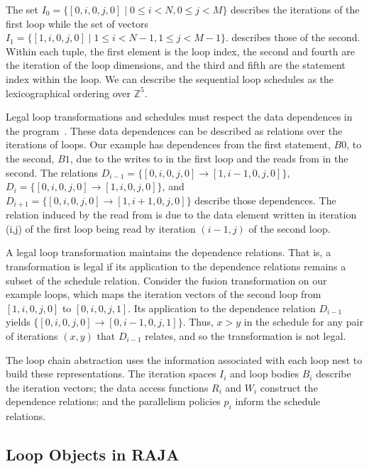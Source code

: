 The set $I_{0}=\{[0,i,0,j,0] \; | \; 0 \leq i < N, 0 \leq j < M\}$ describes
the iterations of the first loop while the set of vectors
$I_{1} = \{[1,i,0,j,0] \; | \; 1 \leq i < N-1, 1 \leq j < M-1\}$. describes
those of the second.
Within each tuple, the first element is the loop index, the second and fourth are the iteration of the loop dimensions, and the third and fifth are the statement index within the loop. 
We can describe the sequential loop schedules as the lexicographical ordering over
$\mathbb{Z}^{5}$.

Legal loop transformations and schedules must respect the data dependences
in the program~\cite{frameworkKP95pub}.
These data dependences can be described as relations over the iterations 
of loops.
Our example has dependences from the first statement, $B0$, to the second,
$B1$, due to the writes to  in the first loop and the reads from
 in the second. 
The relations $D_{i-1} = \{[0,i,0,j,0] \to [1,i-1,0,j,0]\}$,
$D_{i} = \{[0,i,0,j,0] \to [1,i,0,j,0]\}$, and
$D_{i+1} = \{[0,i,0,j,0] \to [1,i+1,0,j,0]\}$ describe those dependences. 
The relation induced by the read from  
is due to the data element written in iteration (i,j) of the
first loop being read by iteration $(i-1,j)$ of the second loop. %

A legal loop transformation maintains the dependence relations. 
That is, a transformation is legal if its application to the dependence
relations remains a subset of the schedule relation.
Consider the fusion transformation on our example loops, which maps the
iteration vectors of the second loop from $[1,i,0,j,0]$ to $[0,i,0,j,1]$. 
Its application to the dependence relation $D_{i-1}$ yields
$\{[0,i,0,j,0] \to [0,i-1,0,j,1]\}$.
Thus, $x > y$ in the schedule for any pair of iterations $(x,y)$ that
$D_{i-1}$ relates, and so the transformation is not legal.

The loop chain abstraction uses the information associated with each loop 
nest to build these representations.
The iteration spaces $I_{i}$ and loop bodies $B_{i}$ describe the iteration
vectors; the data access functions $R_{i}$ and $W_{i}$ construct the
dependence relations; and the parallelism policies $p_{i}$ inform the
schedule relations.

\subsection{Loop Objects in RAJA}

